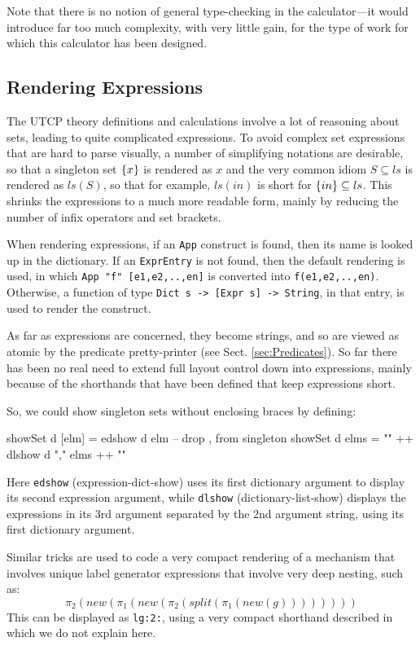 Note that there is no notion of general type-checking
in the calculator---it would introduce far too much complexity,
with very little gain,
for the type of work for which this calculator has been designed.

\subsection{Rendering Expressions}

The UTCP theory definitions and calculations
involve a lot of reasoning about sets,
leading to quite complicated expressions.
To avoid complex set expressions that are hard to parse visually,
a number of simplifying notations are desirable,
so that a singleton set $\{{x}\}$ is rendered as $x$
and the very common idiom $S \subseteq ls$
is rendered as $ls(S)$,
so that for example, $ls(in)$ is short for $\{{in}\} \subseteq ls$.
This shrinks the expressions to a much more readable form,
mainly by reducing the number of infix operators and set brackets.


When rendering expressions,
if an \texttt{App} construct is found, then its name
is looked up in the dictionary.
If an \texttt{ExprEntry} is not found, then the default rendering is used,
in which \verb$App "f" [e1,e2,..,en]$
is converted into \verb$f(e1,e2,..,en)$.
Otherwise, a function of type \verb$Dict s -> [Expr s] -> String$,
in that entry, is used to render the construct.

As far as expressions are concerned,
they become strings, and so are viewed as atomic
by the predicate pretty-printer (see Sect. \ref{sec:Predicates}).
So far there has been no real need to extend full layout control
down into expressions,
mainly because of the shorthands that have been defined
that keep expressions short.

So, we could show singleton sets without enclosing braces
by defining:
\begin{code}
showSet d [elm] = edshow d elm   -- drop {,} from singleton
showSet d elms = "{" ++ dlshow d "," elms ++ "}"
\end{code}
Here \texttt{edshow} (expression-dict-show)
uses its first dictionary argument
to display its second expression argument,
while \texttt{dlshow} (dictionary-list-show) displays the expressions
in its 3rd argument separated by the 2nd argument string,
using its first dictionary argument.

Similar tricks are used to code a very compact rendering
of a mechanism that involves unique label generator expressions
that involve very deep nesting, such as:
\[
 \pi_2(new(\pi_1(new(\pi_2(split(\pi_1(new(g))))))))
\]
This can be displayed as \texttt{lg:2:},
using a very compact shorthand described in \cite{conf/tase/BMN16}
which we do not explain here.


